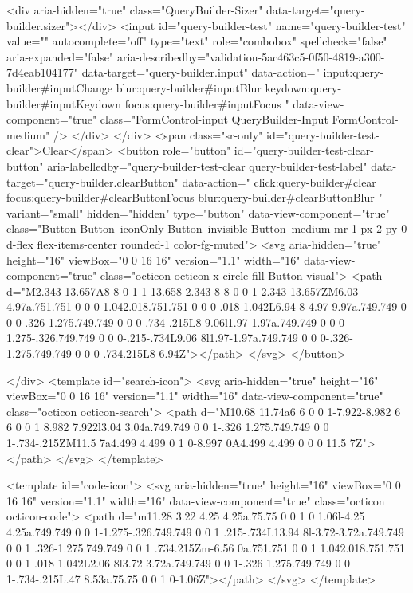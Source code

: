             <div aria-hidden="true" class="QueryBuilder-Sizer" data-target="query-builder.sizer"></div>
            <input id="query-builder-test" name="query-builder-test" value="" autocomplete="off" type="text" role="combobox" spellcheck="false" aria-expanded="false" aria-describedby="validation-5ac463c5-0f50-4819-a300-7d4eab104177" data-target="query-builder.input" data-action="
          input:query-builder#inputChange
          blur:query-builder#inputBlur
          keydown:query-builder#inputKeydown
          focus:query-builder#inputFocus
        " data-view-component="true" class="FormControl-input QueryBuilder-Input FormControl-medium" />
          </div>
        </div>
          <span class="sr-only" id="query-builder-test-clear">Clear</span>
          <button role="button" id="query-builder-test-clear-button" aria-labelledby="query-builder-test-clear query-builder-test-label" data-target="query-builder.clearButton" data-action="
                click:query-builder#clear
                focus:query-builder#clearButtonFocus
                blur:query-builder#clearButtonBlur
              " variant="small" hidden="hidden" type="button" data-view-component="true" class="Button Button--iconOnly Button--invisible Button--medium mr-1 px-2 py-0 d-flex flex-items-center rounded-1 color-fg-muted">  <svg aria-hidden="true" height="16" viewBox="0 0 16 16" version="1.1" width="16" data-view-component="true" class="octicon octicon-x-circle-fill Button-visual">
    <path d="M2.343 13.657A8 8 0 1 1 13.658 2.343 8 8 0 0 1 2.343 13.657ZM6.03 4.97a.751.751 0 0 0-1.042.018.751.751 0 0 0-.018 1.042L6.94 8 4.97 9.97a.749.749 0 0 0 .326 1.275.749.749 0 0 0 .734-.215L8 9.06l1.97 1.97a.749.749 0 0 0 1.275-.326.749.749 0 0 0-.215-.734L9.06 8l1.97-1.97a.749.749 0 0 0-.326-1.275.749.749 0 0 0-.734.215L8 6.94Z"></path>
</svg>
</button>

      </div>
      <template id="search-icon">
  <svg aria-hidden="true" height="16" viewBox="0 0 16 16" version="1.1" width="16" data-view-component="true" class="octicon octicon-search">
    <path d="M10.68 11.74a6 6 0 0 1-7.922-8.982 6 6 0 0 1 8.982 7.922l3.04 3.04a.749.749 0 0 1-.326 1.275.749.749 0 0 1-.734-.215ZM11.5 7a4.499 4.499 0 1 0-8.997 0A4.499 4.499 0 0 0 11.5 7Z"></path>
</svg>
</template>

<template id="code-icon">
  <svg aria-hidden="true" height="16" viewBox="0 0 16 16" version="1.1" width="16" data-view-component="true" class="octicon octicon-code">
    <path d="m11.28 3.22 4.25 4.25a.75.75 0 0 1 0 1.06l-4.25 4.25a.749.749 0 0 1-1.275-.326.749.749 0 0 1 .215-.734L13.94 8l-3.72-3.72a.749.749 0 0 1 .326-1.275.749.749 0 0 1 .734.215Zm-6.56 0a.751.751 0 0 1 1.042.018.751.751 0 0 1 .018 1.042L2.06 8l3.72 3.72a.749.749 0 0 1-.326 1.275.749.749 0 0 1-.734-.215L.47 8.53a.75.75 0 0 1 0-1.06Z"></path>
</svg>
</template>

